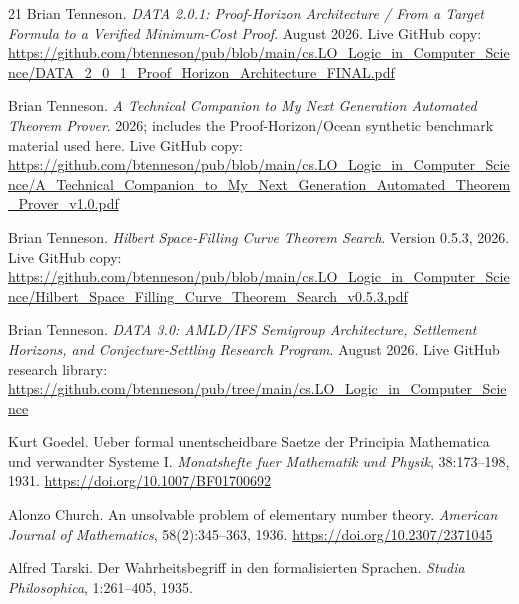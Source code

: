 \begin{thebibliography}{21}
Brian Tenneson.
\emph{DATA 2.0.1: Proof-Horizon Architecture / From a Target Formula to a Verified Minimum-Cost Proof}.
August 2026. Live GitHub copy:
\url{https://github.com/btenneson/pub/blob/main/cs.LO_Logic_in_Computer_Science/DATA_2_0_1_Proof_Horizon_Architecture_FINAL.pdf}

Brian Tenneson.
\emph{A Technical Companion to My Next Generation Automated Theorem Prover}.
2026; includes the Proof-Horizon/Ocean synthetic benchmark material used here. Live GitHub copy:
\url{https://github.com/btenneson/pub/blob/main/cs.LO_Logic_in_Computer_Science/A_Technical_Companion_to_My_Next_Generation_Automated_Theorem_Prover_v1.0.pdf}

Brian Tenneson.
\emph{Hilbert Space-Filling Curve Theorem Search}.
Version 0.5.3, 2026. Live GitHub copy:
\url{https://github.com/btenneson/pub/blob/main/cs.LO_Logic_in_Computer_Science/Hilbert_Space_Filling_Curve_Theorem_Search_v0.5.3.pdf}

Brian Tenneson.
\emph{DATA 3.0: AMLD/IFS Semigroup Architecture, Settlement Horizons, and Conjecture-Settling Research Program}.
August 2026. Live GitHub research library:
\url{https://github.com/btenneson/pub/tree/main/cs.LO_Logic_in_Computer_Science}

Kurt Goedel.
Ueber formal unentscheidbare Saetze der Principia Mathematica und verwandter Systeme I.
\emph{Monatshefte fuer Mathematik und Physik}, 38:173--198, 1931.
\url{https://doi.org/10.1007/BF01700692}

Alonzo Church.
An unsolvable problem of elementary number theory.
\emph{American Journal of Mathematics}, 58(2):345--363, 1936.
\url{https://doi.org/10.2307/2371045}

Alfred Tarski.
Der Wahrheitsbegriff in den formalisierten Sprachen.
\emph{Studia Philosophica}, 1:261--405, 1935.

\end{thebibliography}


